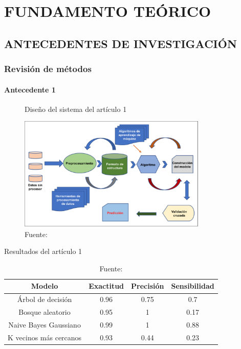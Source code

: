 \chapter{FUNDAMENTO TEÓRICO}
\section{ANTECEDENTES DE INVESTIGACIÓN}

\subsection{Revisión de métodos}
\subsubsection{Antecedente 1}

\lipsum[1]

\begin{figure}[H]
  \centering
  \caption{Diseño del sistema del artículo 1}
  \includegraphics[width=0.8\textwidth]{E_IMAGENES/1_Capitulo2/1-research-background/Paper_1_1.pdf}
  \caption*{Fuente: \citet{9276955}}
  \label{fig:Imagen_1}
\end{figure}

\lipsum[2]

\begin{table}[H]
  \centering
  \caption{Resultados del artículo 1}
  \begin{tabular}{cccc} 
  \hline
  \textbf{Modelo}          & \textbf{Exactitud} & \textbf{Precisión} & \textbf{Sensibilidad}  \\ 
  \hline
  Árbol de
    decisión      & 0.96               & 0.75               & 0.7                    \\ 
  \hline
  Bosque
    aleatorio       & 0.95               & 1                  & 0.17                   \\ 
  \hline
  Naive Bayes
    Gaussiano  & 0.99               & 1                  & 0.88                   \\ 
  \hline
  K vecinos más
    cercanos & 0.93               & 0.44               & 0.23                   \\
  \hline
  \end{tabular}
  \caption*{Fuente: \citet{9276955}}
  \label{tab:Paper_1_3}
\end{table}

